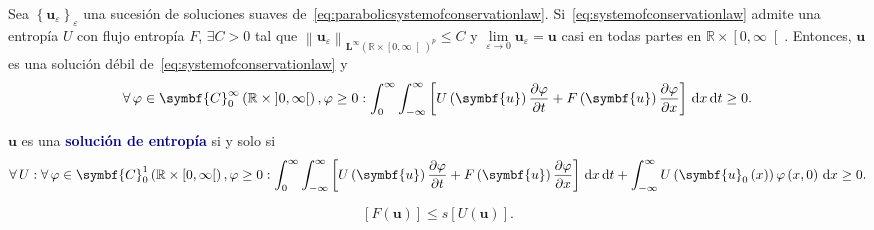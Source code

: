 \begin{theorem}
	Sea
	\begin{math}
		\left\{\symbf{u}_{\varepsilon}\right\}_{\varepsilon}
	\end{math}
	una sucesión de soluciones suaves
	de~\eqref{eq:parabolicsystemofconservationlaw}.
	Si~\eqref{eq:systemofconservationlaw} admite una entropía
	$U$ con flujo entropía $F$, $\exists C>0$ tal que
	\begin{math}
		{\left\|\symbf{u}_{\varepsilon}\right\|}_{
			{\symbf{L}^{\infty}\left(\mathbb{R}\times\left[0,\infty\right[\right)}^{p}
		}\leq C
	\end{math}
	y $\lim\limits_{\varepsilon\to0}\symbf{u}_{\varepsilon}=\symbf{u}$
	casi en todas partes en $\mathbb{R}\times\left[0,\infty\right[$.
	Entonces, $\symbf{u}$ es una solución débil
	de~\eqref{eq:systemofconservationlaw} y
	\begin{equation*}
		\forall\varphi\in
		\symbf{C}^{\infty}_{0}\left(\mathbb{R}\times\left]0,\infty\right[\right),
		\varphi\geq 0:
		\int_{0}^{\infty}
		\int_{-\infty}^{\infty}
		\left[
			U\left(\symbf{u}\right)
			\diffp{\varphi}{t}+
			F\left(\symbf{u}\right)
			\diffp{\varphi}{x}
			\right]
		\dl x
		\dl t\geq 0.
	\end{equation*}
\end{theorem}

\begin{definition}
	$\symbf{u}$ es una \textcolor{DarkBlue}{\bfseries solución de entropía} si y solo si
	\begin{equation*}
		\forall U:
		\forall\varphi\in\symbf{C}^{1}_{0}\left(\mathbb{R}\times\left[0,\infty\right[\right),\varphi\geq 0:
		\int_{0}^{\infty}
		\int_{-\infty}^{\infty}
		\left[
			U\left(\symbf{u}\right)
			\diffp{\varphi}{t}+
			F\left(\symbf{u}\right)
			\diffp{\varphi}{x}
			\right]
		\dl x\dl t+
		\int_{-\infty}^{\infty}
		U\left(\symbf{u}_{0}\left(x\right)\right)
		\varphi\left(x,0\right)\dl x\geq
		0.
	\end{equation*}
\end{definition}

\begin{equation*}
	\left[F\left(\symbf{u}\right)\right]\leq
	s\left[U\left(\symbf{u}\right)\right].
\end{equation*}

